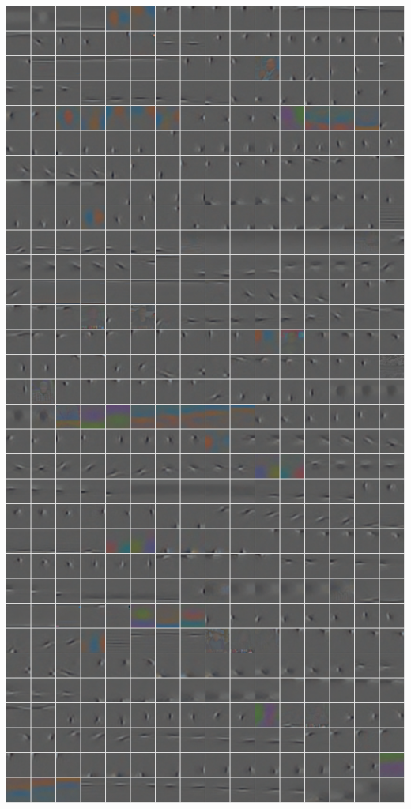 \documentclass{beamer}
\begin{document}
\begin{frame}
\begin{center}
\includegraphics[scale=0.2]{./figures/gsc_yt.png} \hspace{0.5cm} 
\end{center} 
\end{frame} 
\end{document}
